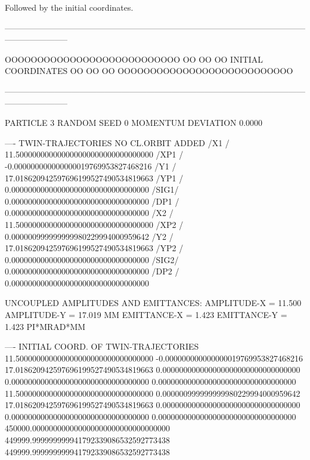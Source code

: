 
\clearpage

Followed by the initial coordinates.

\begin{ctverbatim}
-----------------------------------------------------------------------------------------------------------------------------------

         OOOOOOOOOOOOOOOOOOOOOOOOOOO
         OO                       OO
         OO  INITIAL COORDINATES  OO
         OO                       OO
         OOOOOOOOOOOOOOOOOOOOOOOOOOO

-----------------------------------------------------------------------------------------------------------------------------------



     PARTICLE       3 RANDOM SEED        0 MOMENTUM DEVIATION   0.0000


     ---- TWIN-TRAJECTORIES NO CL.ORBIT ADDED
     /X1  /           11.500000000000000000000000000000000
     /XP1 /           -0.000000000000000019769953827468216
     /Y1  /           17.018620942597696199527490534819663
     /YP1 /            0.000000000000000000000000000000000
     /SIG1/            0.000000000000000000000000000000000
     /DP1 /            0.000000000000000000000000000000000
     /X2  /           11.500000000000000000000000000000000
     /XP2 /            0.000000999999999980229994000959642
     /Y2  /           17.018620942597696199527490534819663
     /YP2 /            0.000000000000000000000000000000000
     /SIG2/            0.000000000000000000000000000000000
     /DP2 /            0.000000000000000000000000000000000


         UNCOUPLED AMPLITUDES AND EMITTANCES:
         AMPLITUDE-X =          11.500          AMPLITUDE-Y =          17.019  MM
         EMITTANCE-X =           1.423          EMITTANCE-Y =           1.423  PI*MRAD*MM

     ---- INITIAL COORD. OF TWIN-TRAJECTORIES
                     11.500000000000000000000000000000000
                     -0.000000000000000019769953827468216
                     17.018620942597696199527490534819663
                      0.000000000000000000000000000000000
                      0.000000000000000000000000000000000
                      0.000000000000000000000000000000000
                     11.500000000000000000000000000000000
                      0.000000999999999980229994000959642
                     17.018620942597696199527490534819663
                      0.000000000000000000000000000000000
                      0.000000000000000000000000000000000
                      0.000000000000000000000000000000000
                 450000.000000000000000000000000000000000
                 449999.999999999941792339086532592773438
                 449999.999999999941792339086532592773438



\end{ctverbatim}
